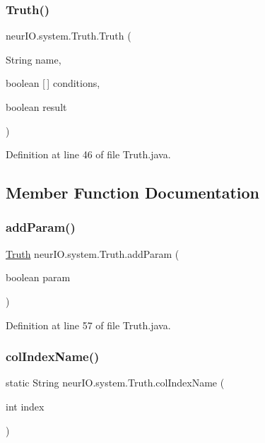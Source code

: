 \subsubsection{\texorpdfstring{Truth()}{Truth()}\hspace{0.1cm}{\footnotesize\ttfamily [5/5]}}
{\footnotesize\ttfamily neur\+I\+O.\+system.\+Truth.\+Truth (\begin{DoxyParamCaption}\item[{String}]{name,  }\item[{boolean \mbox{[}$\,$\mbox{]}}]{conditions,  }\item[{boolean}]{result }\end{DoxyParamCaption})}



Definition at line 46 of file Truth.\+java.



\subsection{Member Function Documentation}
\mbox{\label{classneur_i_o_1_1system_1_1_truth_a7f4d8c214884a035c30e6eb9accb4eb3}} 
\subsubsection{\texorpdfstring{add\+Param()}{addParam()}}
{\footnotesize\ttfamily \hyperlink{classneur_i_o_1_1system_1_1_truth}{Truth} neur\+I\+O.\+system.\+Truth.\+add\+Param (\begin{DoxyParamCaption}\item[{boolean}]{param }\end{DoxyParamCaption})}



Definition at line 57 of file Truth.\+java.

\mbox{\label{classneur_i_o_1_1system_1_1_truth_a111599cd27bfb1e906cad589313c02d7}} 
\subsubsection{\texorpdfstring{col\+Index\+Name()}{colIndexName()}}
{\footnotesize\ttfamily static String neur\+I\+O.\+system.\+Truth.\+col\+Index\+Name (\begin{DoxyParamCaption}\item[{int}]{index }\end{DoxyParamCaption})\hspace{0.3cm}{\ttfamily [static]}}



